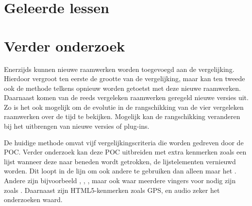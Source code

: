 \section{Geleerde lessen} %


\pagebreak
\section{Verder onderzoek} %


Enerzijds kunnen nieuwe raamwerken worden toegevoegd aan de vergelijking.
Hierdoor vergroot ten eerste de grootte van de vergelijking, maar kan ten tweede ook de methode telkens opnieuw worden getoetst met deze nieuwe raamwerken.
Daarnaast komen van de reeds vergeleken raamwerken geregeld nieuwe versies uit.
Zo is het ook mogelijk om de evolutie in de rangschikking van de vier vergeleken raamwerken over de tijd te bekijken.
Mogelijk kan de rangschikking veranderen bij het uitbrengen van nieuwe versies of plug-ins.

De huidige methode omvat vijf vergelijkingscriteria die worden gedreven door de POC.
Verder onderzoek kan deze POC uitbreiden met extra kenmerken zoals een lijst wanneer deze naar beneden wordt getrokken, de lijstelementen vernieuwd worden.
Dit loopt in de lijn om ook andere  te gebruiken dan alleen maar het  .
Andere  zijn bijvoorbeeld , , , maar ook  waar meerdere vingers voor nodig zijn zoals .
Daarnaast zijn HTML5-kenmerken zoals GPS,  en audio zeker het onderzoeken waard.

